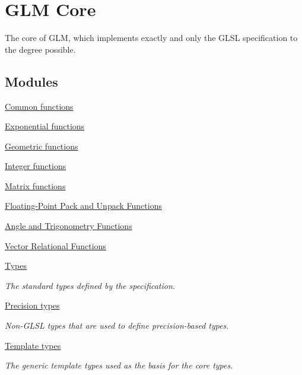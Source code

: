 \hypertarget{group__core}{}\section{G\+LM Core}
\label{group__core}


The core of G\+LM, which implements exactly and only the G\+L\+SL specification to the degree possible.  


\subsection*{Modules}
\begin{DoxyCompactItemize}
\item 
\hyperlink{group__core__func__common}{Common functions}
\item 
\hyperlink{group__core__func__exponential}{Exponential functions}
\item 
\hyperlink{group__core__func__geometric}{Geometric functions}
\item 
\hyperlink{group__core__func__integer}{Integer functions}
\item 
\hyperlink{group__core__func__matrix}{Matrix functions}
\item 
\hyperlink{group__core__func__packing}{Floating-\/\+Point Pack and Unpack Functions}
\item 
\hyperlink{group__core__func__trigonometric}{Angle and Trigonometry Functions}
\item 
\hyperlink{group__core__func__vector__relational}{Vector Relational Functions}
\item 
\hyperlink{group__core__types}{Types}
\begin{DoxyCompactList}\small\item\em The standard types defined by the specification. \end{DoxyCompactList}\item 
\hyperlink{group__core__precision}{Precision types}
\begin{DoxyCompactList}\small\item\em Non-\/\+G\+L\+SL types that are used to define precision-\/based types. \end{DoxyCompactList}\item 
\hyperlink{group__core__template}{Template types}
\begin{DoxyCompactList}\small\item\em The generic template types used as the basis for the core types. \end{DoxyCompactList}\end{DoxyCompactItemize}


